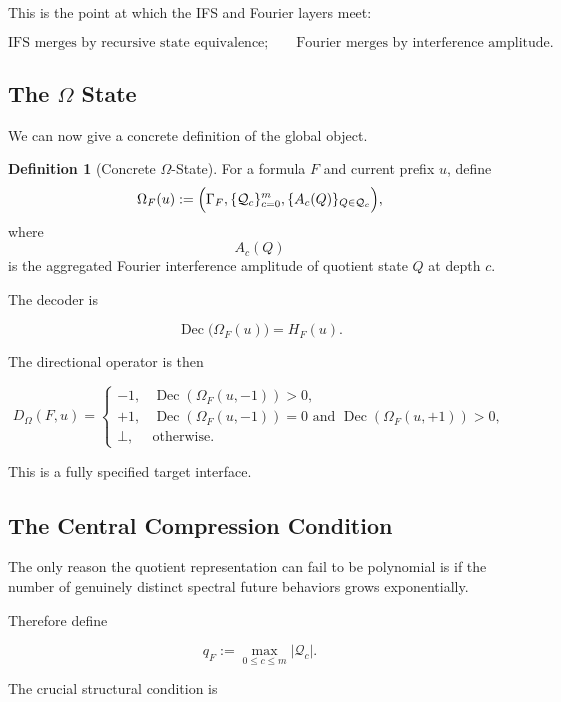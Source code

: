 \documentclass[11pt]{article}
\theoremstyle{plain}
\theoremstyle{definition}
\newtheorem{definition}[theorem]{Definition}
\begin{document}
This is the point at which the IFS and Fourier layers meet:

\[
\boxed{
\text{IFS merges by recursive state equivalence;}
\qquad
\text{Fourier merges by interference amplitude}.
}
\]

\subsection{The \texorpdfstring{\(\Omega\)}{Omega} State}

We can now give a concrete definition of the global object.

\begin{definition}[Concrete \(\Omega\)-State]
\label{def:concrete-omega}
For a formula \(F\) and current prefix \(u\), define
\[
    \Omega_F(u)
    :=
    \Bigl(
        \Gamma_F,
        \{\mathcal{Q}_c\}_{c=0}^{m},
        \{A_c(Q)\}_{Q\in\mathcal{Q}_c}
    \Bigr),
\]
where
\[
    A_c(Q)
\]
is the aggregated Fourier interference amplitude of quotient state \(Q\) at
depth \(c\).
\end{definition}

The decoder is

\[
    \operatorname{Dec}
    \bigl(
        \Omega_F(u)
    \bigr)
    =
    H_F(u).
\]

The directional operator is then

\[
\boxed{
D_\Omega(F,u)
=
\begin{cases}
-1,&
\operatorname{Dec}(\Omega_F(u,-1))>0,
\\[3pt]
+1,&
\operatorname{Dec}(\Omega_F(u,-1))=0
\text{ and }
\operatorname{Dec}(\Omega_F(u,+1))>0,
\\[3pt]
\bot,&\text{otherwise}.
\end{cases}
}
\]

This is a fully specified target interface.

\subsection{The Central Compression Condition}

The only reason the quotient representation can fail to be polynomial is if
the number of genuinely distinct spectral future behaviors grows
exponentially.

Therefore define

\[
    q_F
    :=
    \max_{0\leq c\leq m}
    |\mathcal{Q}_c|.
\]

The crucial structural condition is
\end{document}
